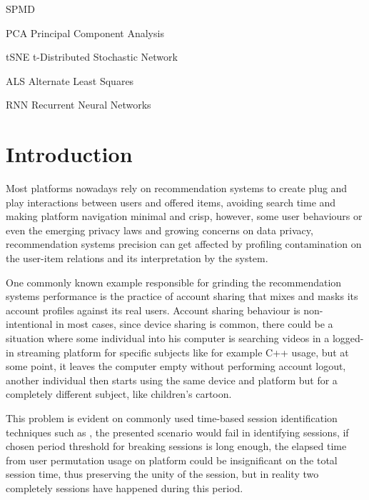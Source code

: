 \documentclass[ecp,tc,english]{iiufrgs}
\begin{document}
\listoffigures 
\listoftables 

\begin{listofabbrv}{SPMD}
    \item[PCA] Principal Component Analysis
    \item[tSNE] t-Distributed Stochastic Network
    \item[ALS] Alternate Least Squares
    \item[RNN] Recurrent Neural Networks
\end{listofabbrv}

\tableofcontents %


\chapter{Introduction}
Most platforms nowadays rely on recommendation systems to create plug and play interactions between users and offered items, avoiding search time and making platform navigation minimal and crisp, however, some user behaviours or even the emerging privacy laws and growing concerns on data privacy, recommendation systems precision can get affected by profiling contamination on the user-item relations  and its interpretation by the system.

One commonly known example responsible for grinding the recommendation systems performance is the practice of account sharing that mixes and masks its account profiles against its real users. Account sharing behaviour is non-intentional in most cases, since device sharing is common, there could be a situation where some individual into his computer is searching videos in a logged-in streaming platform for specific subjects like for example C++ usage, but at some point, it leaves the computer empty without performing account logout, another individual then starts using the same device and platform but for a completely different subject, like children's cartoon.

This problem is evident on commonly used time-based session identification techniques such as \cite{10.1145/2736277.2741117}, the presented scenario would fail in identifying sessions, if chosen period threshold for breaking sessions is long enough, the elapsed time from user permutation usage on platform could be insignificant on the total session time, thus preserving the unity of the session, but in reality two completely sessions have happened during this period.
\end{document}
